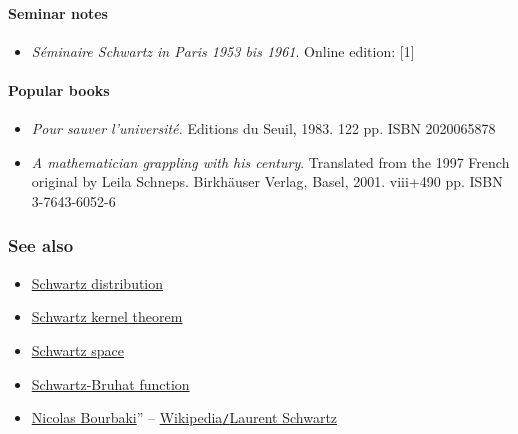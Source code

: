 \documentclass{article}
\begin{document}
\paragraph{Seminar notes}
\begin{itemize}
	\item \textit{Séminaire Schwartz in Paris 1953 bis 1961}. Online edition: [1]
\end{itemize}

\paragraph{Popular books}
\begin{itemize}
	\item \textit{Pour sauver l'université.} Editions du Seuil, 1983. 122 pp. ISBN 2020065878
	\item \textit{A mathematician grappling with his century}. Translated from the 1997 French original by Leila Schneps. Birkhäuser Verlag, Basel, 2001. viii+490 pp. ISBN 3-7643-6052-6
\end{itemize}

\subsubsection{See also}
\begin{itemize}
	\item \href{https://en.wikipedia.org/wiki/Schwartz_distribution}{Schwartz distribution}
	\item \href{https://en.wikipedia.org/wiki/Schwartz_kernel_theorem}{Schwartz kernel theorem}
	\item \href{https://en.wikipedia.org/wiki/Schwartz_space}{Schwartz space}
	\item \href{https://en.wikipedia.org/wiki/Schwartz-Bruhat_function}{Schwartz-Bruhat function}
	\item \href{https://en.wikipedia.org/wiki/Nicolas_Bourbaki}{Nicolas Bourbaki}'' -- \href{https://en.wikipedia.org/wiki/Laurent_Schwartz}{Wikipedia{\tt/}Laurent Schwartz}
\end{itemize}

\end{document}

